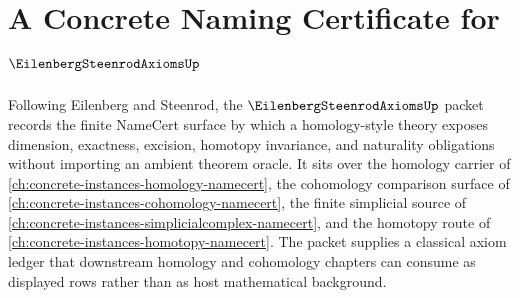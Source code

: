 \chapter{A Concrete Naming Certificate for $\EilenbergSteenrodAxiomsUp$}
\label{ch:concrete-instances-eilenberg-steenrod-axioms-namecert}

Following Eilenberg and Steenrod, the $\EilenbergSteenrodAxiomsUp$ packet records the finite NameCert surface by which a homology-style theory exposes dimension, exactness, excision, homotopy invariance, and naturality obligations without importing an ambient theorem oracle. It sits over the homology carrier of \autoref{ch:concrete-instances-homology-namecert}, the cohomology comparison surface of \autoref{ch:concrete-instances-cohomology-namecert}, the finite simplicial source of \autoref{ch:concrete-instances-simplicialcomplex-namecert}, and the homotopy route of \autoref{ch:concrete-instances-homotopy-namecert}. The packet supplies a classical axiom ledger that downstream homology and cohomology chapters can consume as displayed rows rather than as host mathematical background.

